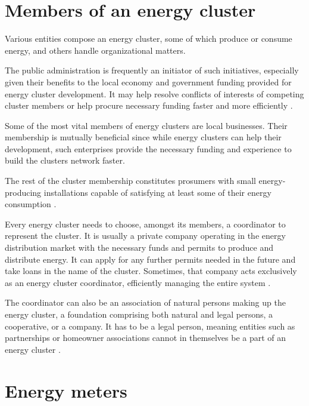 \section {Members of an energy cluster}

\par Various entities compose an energy cluster, some of which produce or consume energy, and others handle organizational matters. 
\par The public administration is frequently an initiator of such initiatives, especially given their benefits to the local economy and government funding provided for energy cluster development. It may help resolve conflicts of interests of competing cluster members or help procure necessary funding faster and more efficiently \citep {ksiazka}.
\par Some of the most vital members of energy clusters are local businesses. Their membership is mutually beneficial since while energy clusters can help their development, such enterprises provide the necessary funding and experience to build the clusters network faster.
\par The rest of the cluster membership constitutes prosumers with small energy-producing installations capable of satisfying at least some of their energy consumption \citep{ksiazka}.
\par Every energy cluster needs to choose, amongst its members, a coordinator to represent the cluster. It is usually a private company operating in the energy distribution market with the necessary funds and permits to produce and distribute energy. It can apply for any further permits needed in the future and take loans in the name of the cluster. Sometimes, that company acts exclusively as an energy cluster coordinator, efficiently managing the entire system \citep{ksiazka}.
\par The coordinator can also be an association of natural persons making up the energy cluster, a foundation comprising both natural and legal persons, a cooperative, or a company. It has to be a legal person, meaning entities such as partnerships or homeowner associations cannot in themselves be a part of an energy cluster \citep{ksiazka}.

\section{Energy meters}


